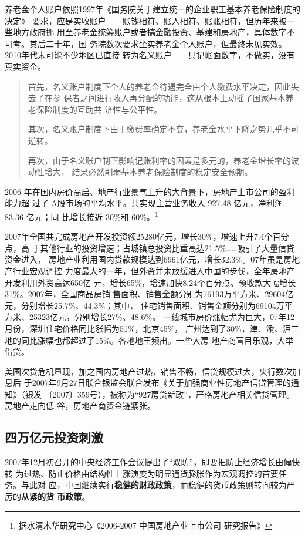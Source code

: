 养老金个人账户依照1997年《国务院关于建立统一的企业职工基本养老保险制度的决定》
要求，应是实收账户——账钱相符、账人相符、账账相符，但历年来被一些地方政府挪
用至养老金统筹账户或者搞金融投资、基建和房地产，具体数字不可考。其后二十年，国
务院数次要求坐实养老金个人账户，但最终未见实效。2010年代末可能不少地区已直接
转为名义账户——只记帐面数字，不做实，没有真实资金。
\begin{quotation}
  首先，名义账户制度下个人的养老金待遇完全由个人缴费水平决定，因此失去了在参
  保者之间进行收入再分配的功能，这从根本上动摇了国家基本养老保险制度的互助共
  济性与公平性。

  其次，名义账户制度下由于缴费率确定不变，养老金水平下降之势几乎不可逆转。

  再次，由于名义账户制下影响记账利率的因素是多元的，养老金增长率的波动性增大，
  结果必然削弱基本养老保险制度的稳定安全预期。\cite{mingyizhanghu}
\end{quotation}


2006 年在国内房价高启、地产行业景气上升的大背景下，房地产上市公司的盈利能力超
过了 A股市场的平均水平。共实现主营业务收入 927.48 亿元，净利润 83.36 亿元；同
比增长接近 30\%和 60\%。\footnote{据水清木华研究中心《2006-2007 中国房地产业上市公司
  研究报告》}

2007年全国共完成房地产开发投资额25280亿元，增长30\%，增速上升7.4个百分点，高
于其他行业的投资增速；占城镇总投资比重高达21.5\%……吸引了大量信贷资金进入，
房地产业利用国内贷款规模达到6961亿元，增长32.3\%。07年虽是房地产行业宏观调控
力度最大的一年，但外资并未放缓进入中国的步伐，全年房地产开发利用外资高达650亿
元，增长65\%，增速加快8.24个百分点。预收款大幅增长31\%。2007年，全国商品房销
售面积、销售金额分别为76193万平方米、29604亿元，分别增长25.7\%、44.3\%；其中，
住宅销售面积、销售金额分别为69104万平方米、25323亿元，分别增长27\%、48.6\%。
一线城市房价涨幅尤为巨大，07年12月份，深圳住宅价格同比涨幅为51\%，北京45\%，
广州达到了30\%，津、渝、沪三地的同比涨幅也都超过了15\%。各地地王频出。一些大房
地产商盲目乐观，大举借贷。

美国次贷危机显现，加之国内房地产过热，销售不畅，信贷规模过大，央行数次加息后
于2007年9月27日联合银监会联合发布《关于加强商业性房地产信贷管理的通知》（银发
〔2007〕359号），被称为“927房贷新政”，严格房地产相关信贷管理。房地产走向低
谷，房地产商资金链紧张。


\subsection{四万亿元投资刺激}

2007年12月初召开的中央经济工作会议提出了“双防”，即要把防止经济增长由偏快转
为过热、防止价格由结构性上涨演变为明显通货膨胀作为宏观调控的首要任务。与此对
应，中国继续实行\textbf{稳健的财政政策}，而稳健的货币政策则转向较为严厉的\textbf{从紧的货
  币政策}。

